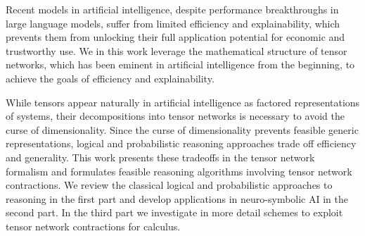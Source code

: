 Recent models in artificial intelligence, despite performance breakthroughs in large language models, suffer from limited efficiency and explainability, which prevents them from unlocking their full application potential for economic and trustworthy use.
We in this work leverage the mathematical structure of tensor networks, which has been eminent in artificial intelligence from the beginning, to achieve the goals of efficiency and explainability.

While tensors appear naturally in artificial intelligence as factored representations of systems, their decompositions into tensor networks is necessary to avoid the curse of dimensionality. %
Since the curse of dimensionality prevents feasible generic representations, logical and probabilistic reasoning approaches trade off efficiency and generality.
This work presents these tradeoffs in the tensor network formalism and formulates feasible reasoning algorithms involving tensor network contractions.
We review the classical logical and probabilistic approaches to reasoning in the first part and develop applications in neuro-symbolic AI in the second part.
In the third part we investigate in more detail schemes to exploit tensor network contractions for calculus.